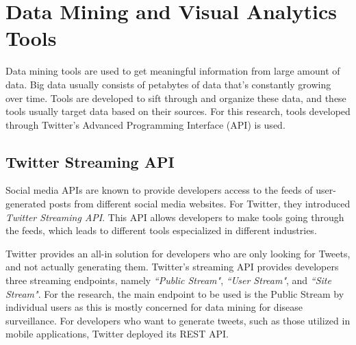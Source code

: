 \section{Data Mining and Visual Analytics Tools}
Data mining tools are used to get meaningful information from large amount of data. Big data usually consists of petabytes of data that's constantly growing over time. Tools are developed to sift through and organize these data, and these tools usually target data based on their sources. For this research, tools developed through Twitter's Advanced Programming Interface (API) is used.

\subsection{Twitter Streaming API \cite{twitterstreamingapi}}

Social media APIs are known to provide developers access to the feeds of user-generated posts from different social media websites. For Twitter, they introduced \textit{Twitter Streaming API}. This API allows developers to make tools going through the feeds, which leads to different tools especialized in different industries. 

Twitter provides an all-in solution for developers who are only looking for Tweets, and not actually generating them. Twitter's streaming API provides developers three streaming endpoints, namely \textit{``Public Stream"}, \textit{``User Stream"}, and \textit{``Site Stream"}. For the research, the main endpoint to be used is the Public Stream by individual users as this is mostly concerned for data mining for disease surveillance. For developers who want to generate tweets, such as those utilized in mobile applications, Twitter deployed its REST API.


